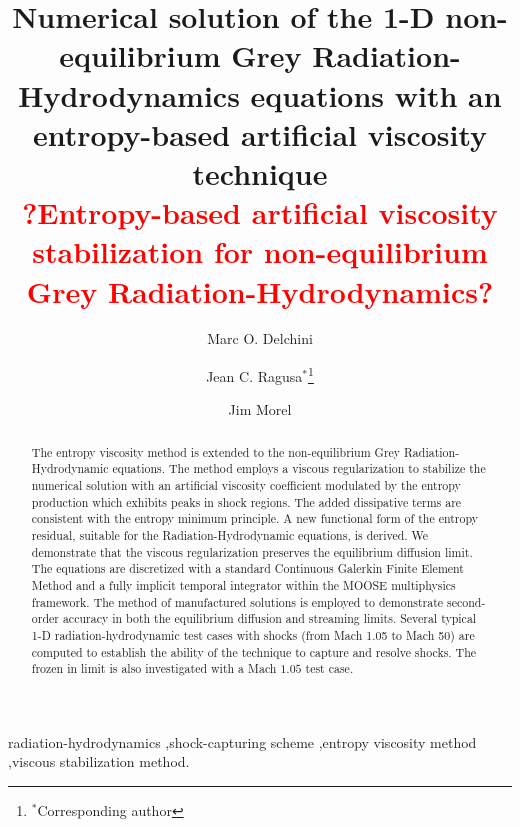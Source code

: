 \documentclass[review]{elsarticle}
\newcommand{\tcr}[1]{\textcolor{red}{#1}}
\begin{document}
%
\begin{frontmatter}
%
\title{Numerical solution of the 1-D non-equilibrium Grey Radiation-Hydrodynamics equations with an entropy-based artificial viscosity technique\\
\tcr{?Entropy-based artificial viscosity stabilization for non-equilibrium Grey Radiation-Hydrodynamics?}}
\author{Marc O. Delchini}
%
\author{Jean C. Ragusa$^*$\footnote{$^*$Corresponding author}}
%
\author{Jim Morel}

\address[label1]{Department of Nuclear Engineering, Texas A\&M University, College Station, TX 77843, USA }

\begin{abstract}
The entropy viscosity method is extended to the non-equilibrium Grey Radiation-Hydrodynamic equations. 
The method employs a viscous regularization to stabilize the numerical solution with an artificial viscosity coefficient modulated by the entropy production which exhibits peaks in shock regions. The added dissipative terms are consistent with the entropy minimum principle.  A new functional form of the entropy residual, suitable for the Radiation-Hydrodynamic equations, is derived. We demonstrate that the viscous regularization preserves the equilibrium diffusion limit. The equations are discretized with a standard Continuous Galerkin Finite Element Method and a fully implicit temporal integrator within the MOOSE multiphysics framework. The method of manufactured solutions is employed to demonstrate second-order accuracy in both the equilibrium diffusion and streaming limits. Several typical 1-D radiation-hydrodynamic test cases with shocks (from Mach 1.05 to Mach 50) are computed to establish the ability of the technique to capture and resolve shocks. The frozen in limit is also investigated with a Mach $1.05$ test case.
\end{abstract}
%
\begin{keyword}
radiation-hydrodynamics \sep shock-capturing scheme \sep entropy viscosity method \sep viscous stabilization method.
\end{keyword}
%
\end{frontmatter}
%
\linenumbers
%
\end{document}
